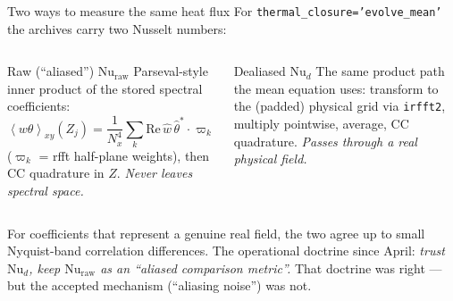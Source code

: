 \documentclass[aspectratio=169,10pt]{beamer}
\newcommand{\avexy}[1]{\left\langle #1 \right\rangle_{xy}}
\newcommand{\Nud}{\mathrm{Nu}_{d}}
\newcommand{\Nuraw}{\mathrm{Nu}_{\mathrm{raw}}}
\begin{document}
\begin{frame}{Two ways to measure the same heat flux}
  For \texttt{thermal\_closure='evolve\_mean'} the archives carry two Nusselt numbers:
  \begin{columns}[T]
    \begin{block}{Raw (``aliased'') $\Nuraw$}
      \small
      Parseval-style inner product of the stored spectral coefficients:
      \[
        \avexy{w\theta}(Z_j) = \frac{1}{N_x^4}\sum_{k}\mathrm{Re}\,
          \hat w\,\hat\theta^{*}\cdot \varpi_k
      \]
      ($\varpi_k$ = rfft half-plane weights), then CC quadrature in $Z$.
      \emph{Never leaves spectral space.}
    \end{block}
    \begin{block}{Dealiased $\Nud$}
      \small
      The same product path the mean equation uses: transform to the
      (padded) physical grid via \texttt{irfft2}, multiply pointwise,
      average, CC quadrature.
      \emph{Passes through a real physical field.}
    \end{block}
  \end{columns}
  \medskip
  For coefficients that represent a genuine real field, the two agree up to small
  Nyquist-band correlation differences. The operational doctrine since April:
  \emph{trust $\Nud$, keep $\Nuraw$ as an ``aliased comparison metric''.}
  That doctrine was right --- but the accepted mechanism (``aliasing noise'') was not.
\end{frame}
\end{document}
